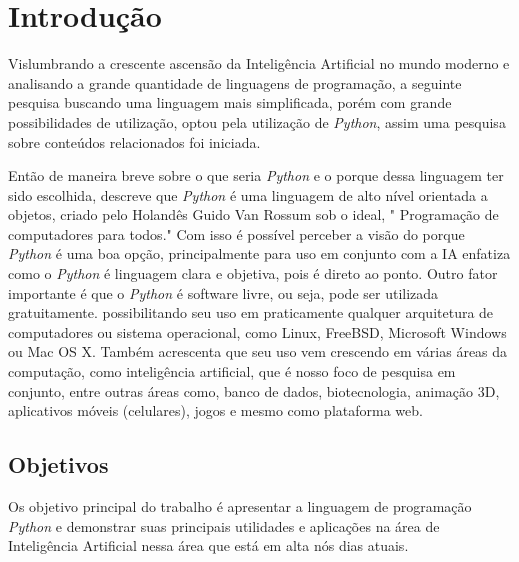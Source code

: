 \chapter{Introdução}
Vislumbrando a crescente ascensão da Inteligência Artificial no mundo moderno e analisando a grande quantidade de linguagens de programação, a seguinte pesquisa buscando uma linguagem mais simplificada, porém com grande possibilidades de utilização, optou pela utilização de \textit{Python}, assim uma pesquisa sobre conteúdos relacionados foi iniciada.

Então de maneira breve sobre o que seria \textit{Python} e o porque dessa linguagem ter sido escolhida, \cite{pythonbasico2024} descreve que \textit{Python} é uma linguagem de alto nível orientada a objetos, criado pelo Holandês Guido Van Rossum sob o ideal, " Programação de computadores para todos." Com isso é possível perceber a visão do porque \textit{Python} é uma boa opção, principalmente para uso em conjunto com a IA \cite{menezes2010introduccao} enfatiza como o \textit{Python} é linguagem clara e objetiva, pois é direto ao ponto. Outro fator importante é que o \textit{Python} é software livre, ou seja, pode ser utilizada gratuitamente. possibilitando seu uso em praticamente qualquer arquitetura de computadores ou sistema operacional, como Linux, FreeBSD, Microsoft Windows ou Mac OS X.
Também acrescenta que seu uso vem crescendo em várias áreas da computação, como inteligência artificial, que é nosso foco de pesquisa em conjunto, entre outras áreas como, banco de dados, biotecnologia, animação 3D, aplicativos móveis (celulares), jogos e mesmo como plataforma web.


\newpage
\section{Objetivos}
Os objetivo principal do trabalho é apresentar a linguagem de programação \textit{Python} e demonstrar suas principais utilidades e aplicações na área de Inteligência Artificial nessa área que está em alta nós dias atuais.

